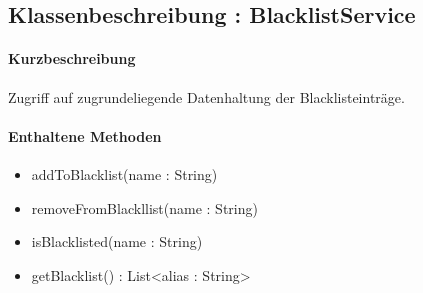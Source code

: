 \subsection{Klassenbeschreibung : BlacklistService}%
\paragraph*{Kurzbeschreibung}
Zugriff auf zugrundeliegende Datenhaltung der Blacklisteinträge.
\paragraph*{Enthaltene Methoden}
\begin{itemize}
    \item addToBlacklist(name : String)
    \item removeFromBlackllist(name : String)
    \item isBlacklisted(name : String)
    \item getBlacklist() : List<alias : String>
\end{itemize}
